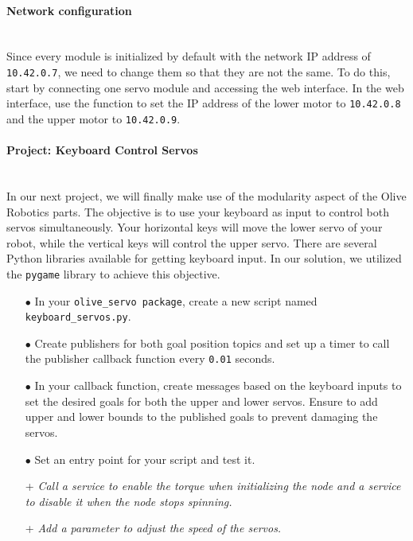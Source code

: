 \documentclass{article}
\begin{document}
\paragraph{Network configuration}~\\
Since every module is initialized by default with the network IP address of \texttt{10.42.0.7}, we need to change them so that they are not the same. To do this, start by connecting one servo module and accessing the web interface. In the web interface, use the function to set the IP address of the lower motor to \texttt{10.42.0.8} and the upper motor to \texttt{10.42.0.9}. 

\paragraph{Project: Keyboard Control Servos}~\\
In our next project, we will finally make use of the modularity aspect of the Olive Robotics parts. The objective is to use your keyboard as input to control both servos simultaneously. Your horizontal keys will move the lower servo of your robot, while the vertical keys will control the upper servo. There are several Python libraries available for getting keyboard input. In our solution, we utilized the \texttt{pygame} library to achieve this objective.

\begin{enumerate}
    \item[$\bullet$] In your \texttt{olive\_servo package}, create a new script named \texttt{keyboard\_servos.py}.

    \item[$\bullet$] Create publishers for both goal position topics and set up a timer to call the publisher callback function every \texttt{0.01} seconds. 

    \item[$\bullet$] In your callback function, create messages based on the keyboard inputs to set the desired goals for both the upper and lower servos. Ensure to add upper and lower bounds to the published goals to prevent damaging the servos.

    \item[$\bullet$] Set an entry point for your script and test it.
    
    \item[+] \textit{Call a service to enable the torque when initializing the node and a service to disable it when the node stops spinning.} 

    \item[+] \textit{Add a parameter to adjust the speed of the servos.} 
\end{enumerate}
\end{document}
